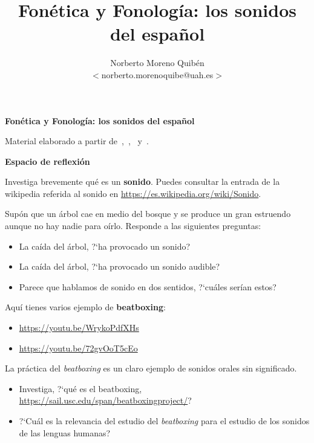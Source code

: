 \documentclass[12pt]{article}
\title{Fonética y Fonología: los sonidos del español}
\author{Norberto Moreno Quibén\\
        \small $<$norberto.morenoquibe@uah.es$>$}
\date{}
\begin{document}

\textbf{\Large Fonética y Fonología: los sonidos del español}

\tableofcontents

Material elaborado a partir de~\textcite{halle1983on-distinctive-featu},~\textcite{gil-fernandez2007fonetica-para-p},~\textcite[volumen \enquote{Fonética y Fonología}][]{rae-asale2009nueva-gramatica-de-l} y~\textcite[capítulo \enquote{Fonética}][]{2016enciclopedia-de-linguistica}.


\printbibliography

\vspace{.5cm}

\textbf{\large Espacio de reflexión}


Investiga brevemente qué es un \textbf{sonido}. Puedes consultar la entrada de la wikipedia referida al sonido en \href{https://es.wikipedia.org/wiki/Sonido}{https://es.wikipedia.org/wiki/Sonido}.

Supón que un árbol cae en medio del bosque y se produce un gran estruendo aunque no hay nadie para oírlo. Responde a las siguientes preguntas:
\begin{itemize}
  \item La caída del árbol, ?`ha provocado un sonido?
\item La caída del árbol, ?`ha provocado un sonido audible?
\item Parece que hablamos de sonido en dos sentidos, ?`cuáles serían estos?
\end{itemize}


Aquí tienes varios ejemplo de \textbf{beatboxing}:
\begin{itemize}
  \item  \href{https://youtu.be/WrykoPdfXHs}{https://youtu.be/WrykoPdfXHs}
  \item \href{https://youtu.be/72gvOoT5cEo}{https://youtu.be/72gvOoT5cEo}
\end{itemize}


La práctica del \textit{beatboxing} es un claro ejemplo de sonidos orales sin significado.

\begin{itemize}
  \item  Investiga, ?`qué es el beatboxing, \href{https://sail.usc.edu/span/beatboxingproject/}{https://sail.usc.edu/span/beatboxingproject/}? 
\item ?`Cuál es la relevancia del estudio del \textit{beatboxing} para el estudio de los sonidos de las lenguas humanas?
\end{itemize}
\end{document}
